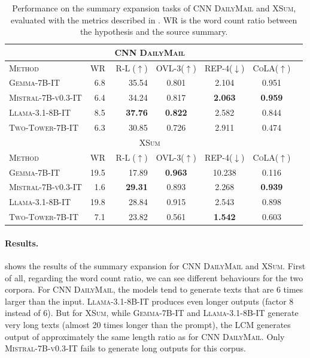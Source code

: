 \documentclass[twoside,11pt]{fairmeta}
\newcommand{\gemmaIT}{\textsc{Gemma-7B-IT}\xspace}
\newcommand{\mistralIT}{\textsc{Mistral-7B-v0.3-IT}\xspace}
\newcommand{\llamaIT}{\textsc{Llama-3.1-8B-IT}\xspace}
\newcommand{\lcm}{\textsc{LCM}\xspace}
\newcommand{\IFTtwotower}{\textsc{Two-Tower-7B-IT}\xspace}
\DeclareMathOperator{\rougel}{R-L}
\newcommand{\cnndm}{\textsc{CNN DailyMail}\xspace}
\newcommand{\xsum}{\textsc{XSum}\xspace}
\newcommand{\ovlthree}{\textsc{OVL-3}\xspace}
\newcommand{\repfour}{\textsc{REP-4}\xspace}
\newcommand{\cola}{\textsc{CoLA}\xspace}
\begin{document}
\begin{table}[!ht]
\centering
\small
\begin{tabular}{@{}lrrcccc@{}}
\toprule

\multicolumn{6}{c}{\cnndm} \\
\midrule
\textsc{Method} & WR & $\rougel$($\uparrow$)
& \ovlthree($\uparrow$)
& \repfour($\downarrow$)
& \cola($\uparrow$) \\
\cmidrule(lr){2-6}
\gemmaIT & 6.8 & 35.54 & 0.801 & 2.104 & 0.951 \\

\mistralIT & 6.4 & 34.24 & 0.817 & \textbf{2.063} & \textbf{0.959} \\

\llamaIT & 8.5 & \textbf{37.76} & \textbf{0.822} & 2.582 & 0.844 \\
\cmidrule{0-6}
\IFTtwotower & 6.3 & 30.85 & 0.726 & 2.911 & 0.474 \\
\bottomrule
\toprule
\multicolumn{6}{c}{\xsum} \\
\midrule
\textsc{Method} & WR & $\rougel$($\uparrow$)
& \ovlthree($\uparrow$)
& \repfour($\downarrow$)
& \cola($\uparrow$) \\
\cmidrule(lr){2-6}
\gemmaIT & 19.5 & 17.89 & \textbf{0.963} & 10.238 & 0.116 \\

\mistralIT & 1.6 & \textbf{29.31} & 0.893 & 2.268 & \textbf{0.939} \\

\llamaIT & 19.8 & 28.84 & 0.915 & 2.543 & 0.898 \\
\cmidrule{0-6}
\IFTtwotower & 7.1 & 23.82 & 0.561 & \textbf{1.542} & 0.603 \\
\bottomrule
\end{tabular}%
\caption{Performance on the summary expansion tasks of \cnndm and \xsum, evaluated with the metrics described in . WR is the word count ratio between the hypothesis and the source summary.}
\label{tabl:i-summ}
\end{table}












\paragraph{Results.}
 shows the results of the summary expansion for \cnndm and \xsum.
First of all, regarding the word count ratio, we can see different behaviours for the two corpora.
For \cnndm, the models tend to generate texts that are 6 times larger than the input. \llamaIT produces even longer outputs (factor 8 instead of 6).
But for \xsum, while \gemmaIT and \llamaIT generate very long texts (almost 20 times longer than the prompt), the \lcm generates output of approximately the same length ratio as for \cnndm. Only \mistralIT fails to generate long outputs for this corpus.
\end{document}
